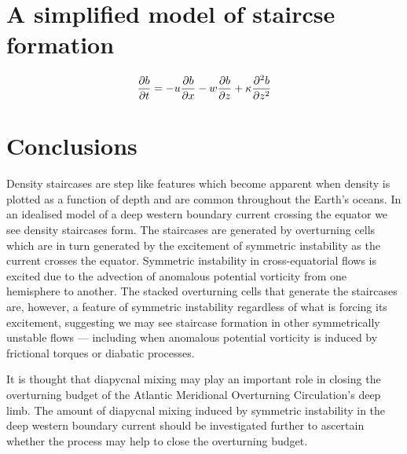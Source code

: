 \section{A simplified model of staircse formation}

\begin{equation}
    \pdv{b}{t} = - u \pdv{b}{x} - w \pdv{b}{z} + \kappa \pdv[2]{b}{z}
\end{equation}

\section{Conclusions}
\label{sec:conc}
Density staircases are step like features which become apparent when density is plotted as a function of depth and are common throughout the Earth's oceans. In an idealised model of a deep western boundary current crossing the equator we see density staircases form. The staircases are generated by overturning cells which are in turn generated by the excitement of symmetric instability as the current crosses the equator. Symmetric instability in cross-equatorial flows is excited due to the advection of anomalous potential vorticity from one hemisphere to another. The stacked overturning cells that generate the staircases are, however, a feature of symmetric instability regardless of what is forcing its excitement, suggesting we may see staircase formation in other symmetrically unstable flows --- including when anomalous potential vorticity is induced by frictional torques or diabatic processes.

It is thought that diapycnal mixing may play an important role in closing the overturning budget of the Atlantic Meridional Overturning Circulation's deep limb. The amount of diapycnal mixing induced by symmetric instability in the deep western boundary current should be investigated further to ascertain whether the process may help to close the overturning budget.